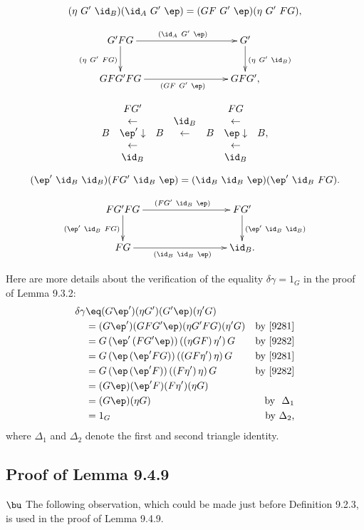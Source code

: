 \documentclass[12pt]{article}
\begin{document}
$$
(\eta\ G'\ \id_B)(\id_A\ G'\ \ep)=(GF\ G'\ \ep)(\eta\ G'\ FG),
$$

$$
\xymatrix{
G'FG\ar[rrr]^{(\id_A\ G'\ \ep)}\ar[d]_{(\eta\ G'\ FG)}&&&G'\ar[d]^{(\eta\ G'\ \id_B)}\\ 
GFG'FG\ar[rrr]_{(GF\ G'\ \ep)}&&&GFG',}
$$

\newpage

$$
\begin{array}{ccccccc}
&FG'&&&&FG\\
&\leftarrow&&\id_B&&\leftarrow\\
B&\ep'\downarrow&B&\leftarrow&B&\ep\downarrow&B,\\
&\leftarrow&&&&\leftarrow\\
&\id_B&&&&\id_B
\end{array}
$$

$$
(\ep'\ \id_B\ \id_B)(FG'\ \id_B\ \ep)=(\id_B\ \id_B\ \ep)(\ep'\ \id_B\ FG).
$$

$$
\xymatrix{
FG'FG\ar[rrr]^{(FG'\ \id_B\ \ep)}\ar[d]_{(\ep'\ \id_B\ FG)}&&&FG'\ar[d]^{(\ep'\ \id_B\ \id_B)}\\ 
FG\ar[rrr]_{(\id_B\ \id_B\ \ep)}&&&\id_B.}
$$ 

Here are more details about the verification of the equality $\delta\gamma=1_G$ in the proof of Lemma 9.3.2: 
\begin{align*}
\delta\gamma &\eq(G\ep')(\eta G')(G'\ep)(\eta'G)\\
&=(G\ep')(G F G'\ep)(\eta G' F G)(\eta'G)&\text{by \eqref{9281}}\\
&=G\,(\ep'\,(FG'\ep))\,((\eta GF)\,\eta')\,G&\text{by \eqref{9282}}\\
&=G\,(\ep\,(\ep'FG))\,((GF\eta')\,\eta)\,G&\text{by \eqref{9281}}\\
&=G\,(\ep\,(\ep'F))\,((F\eta')\,\eta)\,G&\text{by \eqref{9282}}\\
&=(G\ep)(\ep' F)(F\eta')(\eta G)\\
&=(G\ep)(\eta G)&\text{by $\ \Delta_1$}\\
&=1_G&\text{by $\Delta_2$,}
\end{align*} 
where $\Delta_1$ and $\Delta_2$ denote the first and second triangle identity.


\subsection{Proof of Lemma 9.4.9}

$\bu$ The following observation, which could be made just before Definition 9.2.3, is used in the proof of Lemma 9.4.9.
\end{document}
